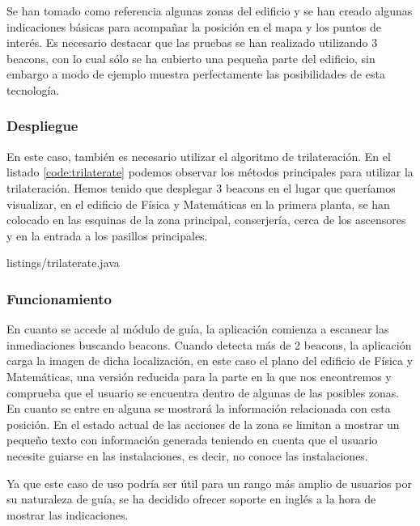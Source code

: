 Se han tomado como referencia algunas zonas del edificio y se han creado algunas indicaciones básicas para acompañar la posición en el mapa y los puntos de interés. Es necesario destacar que las pruebas se han realizado utilizando 3 beacons, con lo cual sólo se ha cubierto una pequeña parte del edificio, sin embargo a modo de ejemplo muestra perfectamente las posibilidades de esta tecnología.

\subsubsection{Despliegue}

En este caso, también es necesario utilizar el algoritmo de trilateración. En el listado \ref{code:trilaterate} podemos observar los métodos principales para utilizar la trilateración. Hemos tenido que desplegar 3 beacons en el lugar que queríamos visualizar, en el edificio de Física y Matemáticas en la primera planta, se han colocado en las esquinas de la zona principal, conserjería, cerca de los ascensores y en la entrada a los pasillos principales.



{listings/trilaterate.java} %


\subsubsection{Funcionamiento}


En cuanto se accede al módulo de guía, la aplicación comienza a escanear las inmediaciones buscando beacons. Cuando detecta más de 2 beacons, la aplicación carga la imagen de dicha localización, en este caso el plano del edificio de Física y Matemáticas, una versión reducida para la parte en la que nos encontremos y comprueba que el usuario se encuentra dentro de algunas de las posibles zonas. En cuanto se entre en alguna se mostrará la información relacionada con esta posición. En el estado actual de \BulletPoint{} las acciones de la zona se limitan a mostrar un pequeño texto con información generada teniendo en cuenta que el usuario necesite guiarse en las instalaciones, es decir, no conoce las instalaciones.


Ya que este caso de uso podría ser útil para un rango más amplio de usuarios por su naturaleza de guía, se ha decidido ofrecer soporte en inglés a la hora de mostrar las indicaciones.

